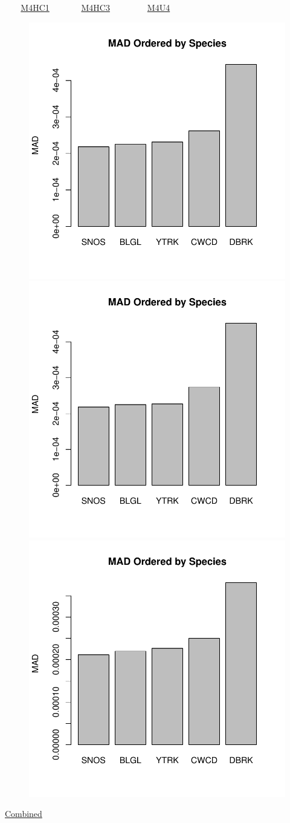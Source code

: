 \documentclass[ xcolor = pdftex, dvipsnames, table ]{beamer}
\begin{document}
%
\begin{frame}{$~~~~~~~$ \href{https://github.com/gasduster99/sppComp/tree/master/sscRuns/25319781982M4HC1}{M4HC1} $~~~~~~~~~~~~~~$ \href{https://github.com/gasduster99/sppComp/tree/master/sscRuns/25319781982M4HC3}{M4HC3} $~~~~~~~~~~~~~~~~~$ \href{https://github.com/gasduster99/sppComp/tree/master/sscRuns/25319781982M4U4}{M4U4} }
        \begin{figure}[ht!]
        \centering
        \hspace*{-1cm}
        \includegraphics[width=.4\textwidth]{../sscRuns/25319781982M4HC1/sppTailMad68.pdf}
        \includegraphics[width=.4\textwidth]{../sscRuns/25319781982M4HC3/sppTailMad68.pdf}
        \includegraphics[width=.4\textwidth]{../sscRuns/25319781982M4U4/sppTailMad68.pdf}
        \end{figure}
	\vspace{-1cm}
	\begin{center}
	\Large
	\href{https://github.com/gasduster99/sppComp/tree/master/try1/postSSC/25319781982M4HC1HC3U4}{Combined}
	\end{center}
\end{frame}
\end{document}
